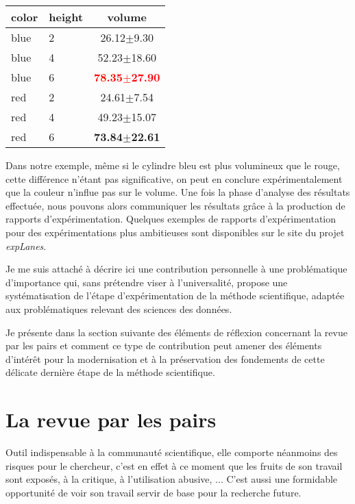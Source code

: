 \begin{margintable}
\caption{Visualisation sous forme de table \LaTeX.}
\begin{tabular}{llc}
color & height & volume \\
\hline
blue & 2 &  26.12$\pm$9.30 \\
blue & 4 & 52.23$\pm$18.60 \\
blue & 6 & \textbf{\textcolor{red}{78.35$\pm$27.90}} \\
red & 2 &  24.61$\pm$7.54 \\
red & 4 & 49.23$\pm$15.07 \\
red & 6 & \textbf{73.84$\pm$22.61} \\
\end{tabular}
\end{margintable}

Dans notre exemple, même si le cylindre bleu est plus volumineux que le rouge, cette différence n'étant pas significative, on peut en conclure expérimentalement que la couleur n'influe pas sur le volume. Une fois la phase d'analyse des résultats effectuée, nous pouvons alors communiquer les résultats grâce à la production de rapports d'expérimentation. Quelques exemples de rapports d'expérimentation pour des expérimentations plus ambitieuses sont disponibles sur le site du projet \textsl{expLanes}.

Je me suis attaché à décrire ici une contribution personnelle à une problématique d'importance qui, sans prétendre viser à l'universalité, propose une systématisation de l'étape d'expérimentation de la méthode scientifique, adaptée aux problématiques relevant des sciences des données.

Je présente dans la section suivante des éléments de réflexion concernant la revue par les pairs et comment ce type de contribution peut amener des éléments d'intérêt pour la modernisation et à la préservation des fondements de cette délicate dernière étape de la méthode scientifique.

\section{\nmu La revue par les pairs} \label{sec:pairs}

Outil indispensable à la communauté scientifique, elle comporte néanmoins des risques pour le chercheur, c'est en effet à ce moment que les fruits de son travail sont exposés, à la critique, à l'utilisation abusive, ... C'est aussi une formidable opportunité de voir son travail servir de base pour la recherche future.


